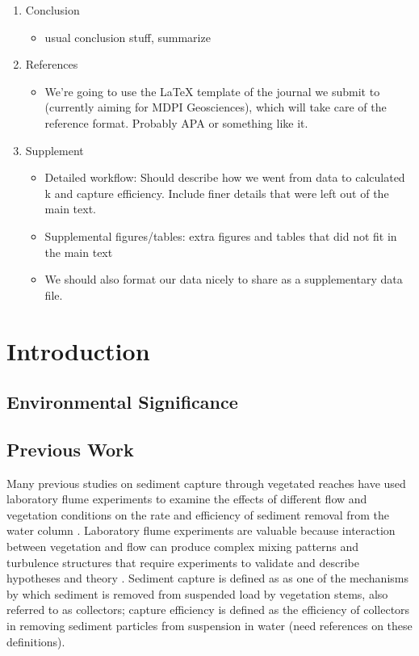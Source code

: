 \documentclass{scrreprt}
\begin{document}
\begin{enumerate}
    \item Conclusion
    \begin{itemize}
        \item usual conclusion stuff, summarize
    \end{itemize}
    
    \item References
    \begin{itemize}
        \item We're going to use the LaTeX template of the journal we submit to (currently aiming for MDPI Geosciences), which will take care of the reference format. Probably APA or something like it.
    \end{itemize}
    
    \item Supplement
    \begin{itemize}
        \item Detailed workflow: Should describe how we went from data to calculated k and capture efficiency. Include finer details that were left out of the main text.
        \item Supplemental figures/tables: extra figures and tables that did not fit in the main text
        \item We should also format our data nicely to share as a supplementary data file.
    \end{itemize}
    
\end{enumerate}

\chapter{Introduction}

\section{Environmental Significance}

\section{Previous Work}

Many previous studies on sediment capture through vegetated reaches have used laboratory flume experiments to examine the effects of different flow and vegetation conditions on the rate and efficiency of sediment removal from the water column \citep{Fauria_2015, Palmer_2004, Purich_2007,  Zhang_reconfiguration_2020, Zhang_turbulence_2020}. Laboratory flume experiments are valuable because interaction between vegetation and flow can produce complex mixing patterns and turbulence structures that require experiments to validate and describe hypotheses and theory \citep{Nepf_2012, Nepf_2008}. Sediment capture is defined as as one of the mechanisms by which sediment is removed from suspended load by vegetation stems, also referred to as collectors; capture efficiency is defined as the efficiency of collectors in removing sediment particles from suspension in water (need references on these definitions).  
\end{document}
